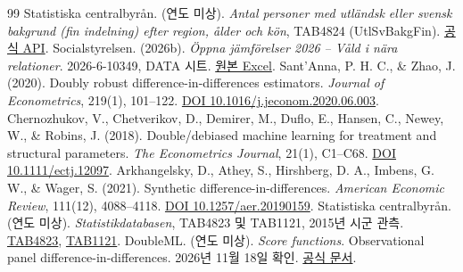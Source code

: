 \documentclass[11pt,a4paper]{article}
\begin{document}
\begin{thebibliography}{99}
 Statistiska centralbyrån. (연도 미상). \textit{Antal personer med utländsk eller svensk bakgrund (fin indelning) efter region, ålder och kön}, TAB4824 (UtlSvBakgFin). \href{https://statistikdatabasen.scb.se/api/v2/tables/TAB4824/metadata?lang=sv}{공식 API}.
 Socialstyrelsen. (2026b). \textit{Öppna jämförelser 2026 -- Våld i nära relationer}. 2026-6-10349, DATA 시트. \href{https://www.socialstyrelsen.se/contentassets/11a181f7bb3f4fd3b827c842b7df21c9/2026-6-10349.xlsx}{원본 Excel}.
 Sant'Anna, P. H. C., \& Zhao, J. (2020). Doubly robust difference-in-differences estimators. \textit{Journal of Econometrics}, 219(1), 101--122. \href{https://doi.org/10.1016/j.jeconom.2020.06.003}{DOI 10.1016/j.jeconom.2020.06.003}.
 Chernozhukov, V., Chetverikov, D., Demirer, M., Duflo, E., Hansen, C., Newey, W., \& Robins, J. (2018). Double/debiased machine learning for treatment and structural parameters. \textit{The Econometrics Journal}, 21(1), C1--C68. \href{https://doi.org/10.1111/ectj.12097}{DOI 10.1111/ectj.12097}.
 Arkhangelsky, D., Athey, S., Hirshberg, D. A., Imbens, G. W., \& Wager, S. (2021). Synthetic difference-in-differences. \textit{American Economic Review}, 111(12), 4088--4118. \href{https://doi.org/10.1257/aer.20190159}{DOI 10.1257/aer.20190159}.
 Statistiska centralbyrån. (연도 미상). \textit{Statistikdatabasen}, TAB4823 및 TAB1121, 2015년 시군 관측. \href{https://statistikdatabasen.scb.se/api/v2/tables/TAB4823/metadata?lang=sv}{TAB4823}, \href{https://statistikdatabasen.scb.se/api/v2/tables/TAB1121/metadata?lang=sv}{TAB1121}.
 DoubleML. (연도 미상). \textit{Score functions}. Observational panel difference-in-differences. 2026년 11월 18일 확인. \href{https://docs.doubleml.org/stable/guide/scores.html}{공식 문서}.
\end{thebibliography}
\endgroup
\end{document}
